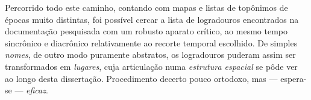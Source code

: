 Percorrido todo este caminho, contando com mapas e listas de topônimos de épocas muito distintas, foi possível cercar a lista de logradouros encontrados na documentação pesquisada com um robusto aparato crítico, ao mesmo tempo sincrônico e diacrônico relativamente ao recorte temporal escolhido. De simples \textit{nomes}, de outro modo puramente abstratos, os logradouros puderam assim ser transformados em \textit{lugares}, cuja articulação numa \textit{estrutura espacial} se pôde ver ao longo desta dissertação. Procedimento decerto pouco ortodoxo, mas --- espera-se --- \textit{eficaz}.